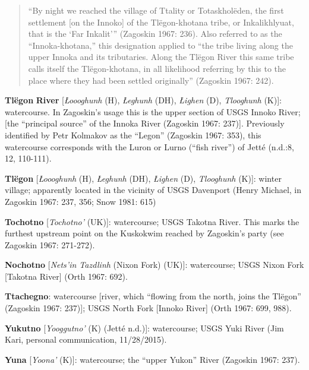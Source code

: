 \begin{hang}
\begin{quote}“By night we reached the village of Ttality or Totaskholëden, the first settlement [on the Innoko] of the Tlëgon-khotana tribe, or Inkalikhlyuat, that is the ‘Far Inkalit’” (Zagoskin 1967: 236). Also referred to as the “Innoka-khotana,” this designation applied to “the tribe living along the upper Innoka and its tributaries. Along the Tlëgon River this same tribe calls itself the Tlëgon-khotana, in all likelihood referring by this to the place where they had been settled originally” (Zagoskin 1967: 242).
\end{quote}


\textbf{Tlëgon} \textbf{River} [\textit{Łoooghunh} (H), \textit{Łeghunh} (DH), \textit{Łighen} (D), \textit{Tlooghunh} (K)]: watercourse. In Zagoskin’s usage this is the upper section of USGS Innoko River; [the “principal source” of the Innoka River (Zagoskin 1967: 237)]. Previously identified by Petr Kolmakov as the “Legon” (Zagoskin 1967: 353), this watercourse corresponds with the Luron or Lurno (“fish river”) of Jetté (n.d.:8, 12, 110-111).



\textbf{Tlëgon} [\textit{Łoooghunh} (H), \textit{Łeghunh} (DH), \textit{Łighen} (D), \textit{Tlooghunh} (K)]: winter village; apparently located in the vicinity of USGS Davenport (Henry Michael, in Zagoskin 1967: 237, 356; Snow 1981: 615)



\textbf{Tochotno} [\textit{Tochotno’} (UK)]: watercourse; USGS Takotna River. This marks the furthest upstream point on the Kuskokwim reached by Zagoskin’s party (see Zagoskin 1967: 271-272).



\textbf{Nochotno} [\textit{Nets’in Tazdlinh} (Nixon Fork) (UK)]: watercourse; USGS Nixon Fork [Takotna River] (Orth 1967: 692).



\textbf{Ttachegno}: watercourse [river, which “flowing from the north, joins the Tlëgon” (Zagoskin 1967: 237)]; USGS North Fork [Innoko River] (Orth 1967: 699, 988).



\textbf{Yukutno} [\textit{Yooggutno’} (K) (Jetté n.d.)]: watercourse; USGS Yuki River (Jim Kari, personal communication, 11/28/2015).



\textbf{Yuna} [\textit{Yoona’} (K)]: watercourse; the “upper Yukon” River (Zagoskin 1967: 237).




\end{hang}
